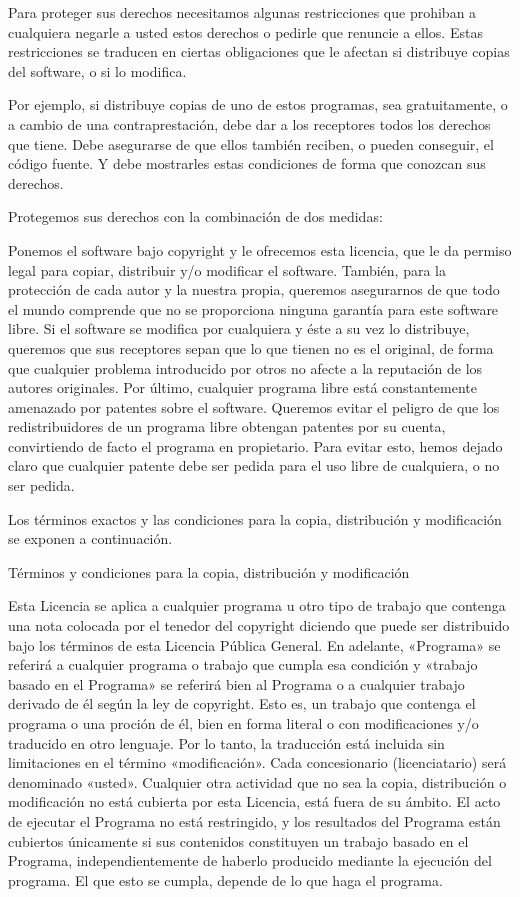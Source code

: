 Para proteger sus derechos necesitamos algunas restricciones que prohiban a cualquiera negarle a usted estos derechos o pedirle que renuncie a ellos. Estas restricciones se traducen en ciertas obligaciones que le afectan si distribuye copias del software, o si lo modifica.

Por ejemplo, si distribuye copias de uno de estos programas, sea gratuitamente, o a cambio de una contraprestación, debe dar a los receptores todos los derechos que tiene. Debe asegurarse de que ellos también reciben, o pueden conseguir, el código fuente. Y debe mostrarles estas condiciones de forma que conozcan sus derechos.

Protegemos sus derechos con la combinación de dos medidas:

Ponemos el software bajo copyright y
le ofrecemos esta licencia, que le da permiso legal para copiar, distribuir y/o modificar el software.
También, para la protección de cada autor y la nuestra propia, queremos asegurarnos de que todo el mundo comprende que no se proporciona ninguna garantía para este software libre. Si el software se modifica por cualquiera y éste a su vez lo distribuye, queremos que sus receptores sepan que lo que tienen no es el original, de forma que cualquier problema introducido por otros no afecte a la reputación de los autores originales.
Por último, cualquier programa libre está constantemente amenazado por patentes sobre el software. Queremos evitar el peligro de que los redistribuidores de un programa libre obtengan patentes por su cuenta, convirtiendo de facto el programa en propietario. Para evitar esto, hemos dejado claro que cualquier patente debe ser pedida para el uso libre de cualquiera, o no ser pedida.

Los términos exactos y las condiciones para la copia, distribución y modificación se exponen a continuación.

Términos y condiciones para la copia, distribución y modificación

Esta Licencia se aplica a cualquier programa u otro tipo de trabajo que contenga una nota colocada por el tenedor del copyright diciendo que puede ser distribuido bajo los términos de esta Licencia Pública General. En adelante, «Programa» se referirá a cualquier programa o trabajo que cumpla esa condición y «trabajo basado en el Programa» se referirá bien al Programa o a cualquier trabajo derivado de él según la ley de copyright. Esto es, un trabajo que contenga el programa o una proción de él, bien en forma literal o con modificaciones y/o traducido en otro lenguaje. Por lo tanto, la traducción está incluida sin limitaciones en el término «modificación». Cada concesionario (licenciatario) será denominado «usted».
Cualquier otra actividad que no sea la copia, distribución o modificación no está cubierta por esta Licencia, está fuera de su ámbito. El acto de ejecutar el Programa no está restringido, y los resultados del Programa están cubiertos únicamente si sus contenidos constituyen un trabajo basado en el Programa, independientemente de haberlo producido mediante la ejecución del programa. El que esto se cumpla, depende de lo que haga el programa.

